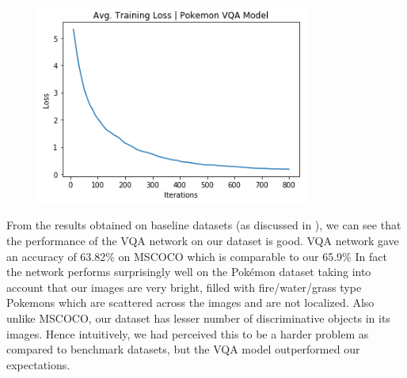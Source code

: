 \documentclass[journal, a4paper]{IEEEtran}
\begin{document}
    \begin{figure}[ht]
    \centering
     \includegraphics[scale = 0.6, width=9cm]{train_loss_curve.png}
    \end{figure}
    
	
	From the results obtained on baseline datasets (as discussed in \cite{VQA_MODEL}), we can see that the performance of the VQA network on our dataset is good. VQA network gave an accuracy of 63.82\% on MSCOCO which is comparable to our 65.9\% In fact the network performs surprisingly well on the Pok\'emon dataset taking into account that our images are very bright, filled with fire/water/grass type Pokemons which are scattered across the images and are not localized. Also unlike MSCOCO, our dataset has lesser number of discriminative objects in its images. Hence intuitively, we had perceived this to be a harder problem as compared to benchmark datasets, but the VQA model outperformed our expectations.   
	
\end{document}
